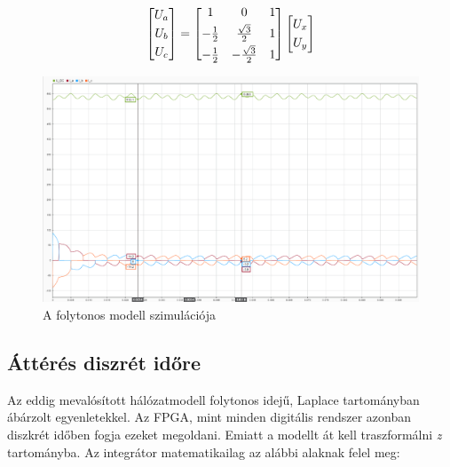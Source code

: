 \begin{equation}
$$
\centering
\begin{bmatrix}
       U_a\\[0.3em]
       U_b\\[0.3em]
       U_c          
\end{bmatrix}
=
\begin{bmatrix}
       1 & 0 & 1  \\[0.3em]
       -\frac{1}{2} & \frac{\sqrt{3}}{2} & 1  \\[0.3em]
       -\frac{1}{2} & -\frac{\sqrt{3}}{2} & 1 
\end{bmatrix}
\begin{bmatrix}
       U_x\\[0.3em]
       U_y         
\end{bmatrix}
$$    
\end{equation}



\begin{figure}[H!]
	\centering
	\includegraphics[width = \textwidth]{figures/continous_testrun_1.png}
	\caption{A folytonos modell szimulációja} 
	\label{fig:cont_run}
\end{figure}


\subsection{Áttérés diszrét időre}

Az eddig mevalósított hálózatmodell folytonos idejű, Laplace tartományban ábárzolt egyenletekkel. Az FPGA, mint minden digitális rendszer azonban diszkrét időben fogja ezeket megoldani. Emiatt a modellt át kell traszformálni \emph{z} tartományba. Az integrátor matematikailag az alábbi alaknak felel meg:

